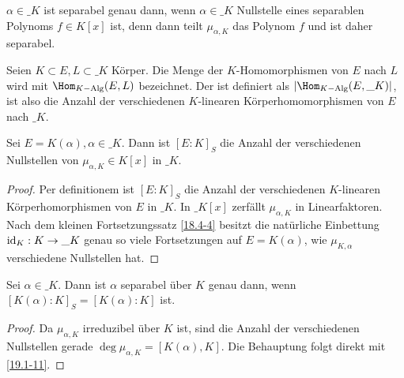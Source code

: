 \begin{nt} \label{19.1-9}
	$\alpha \in \_K$ ist separabel genau dann, wenn $\alpha \in \_K$ Nullstelle eines separablen Polynoms $f \in K[x]$ ist, denn dann teilt $\mu_{\alpha, K}$ das Polynom $f$ und ist daher separabel.
\end{nt}

\begin{df} \label{19.1-10}
	Seien $K \subset E, L \subset \_K$ Körper.
	Die Menge der $K$-Homomorphismen von $E$ nach $L$ wird mit $\Hom_{K-\text{Alg}}(E, L)$ bezeichnet.
	Der  ist definiert als $|\Hom_{K-\text{Alg}}(E, \_K)|$, ist also die Anzahl der verschiedenen $K$-linearen Körperhomomorphismen von $E$ nach $\_K$.
\end{df}

\begin{lem} \label{19.1-11}
	Sei $E = K(\alpha), \alpha \in \_K$.
	Dann ist $[E : K]_S$ die Anzahl der verschiedenen Nullstellen von $\mu_{\alpha, K} \in K[x]$ in $\_K$.
	\begin{proof}
		Per definitionem ist $[E : K]_S$ die Anzahl der verschiedenen $K$-linearen Körperhomorphismen von $E$ in $\_K$.
		In $\_K[x]$ zerfällt $\mu_{\alpha, K}$ in Linearfaktoren.
		Nach dem kleinen Fortsetzungssatz \ref{18.4-4} besitzt die natürliche Einbettung $\operatorname{id}_K: K \to \_K$ genau so viele Fortsetzungen auf $E = K(\alpha)$, wie $\mu_{K, \alpha}$ verschiedene Nullstellen hat.
	\end{proof}
\end{lem}

\begin{kor} \label{19.1-12}
	Sei $\alpha \in \_K$.
	Dann ist $\alpha$ separabel über $K$ genau dann, wenn $[K(\alpha) : K]_S = [K(\alpha) : K]$ ist.
	\begin{proof}
		Da $\mu_{\alpha, K}$ irreduzibel über $K$ ist, sind die Anzahl der verschiedenen Nullstellen gerade $\deg \mu_{\alpha, K} = [K(\alpha), K]$.
		Die Behauptung folgt direkt mit \ref{19.1-11}.
	\end{proof}
\end{kor}

